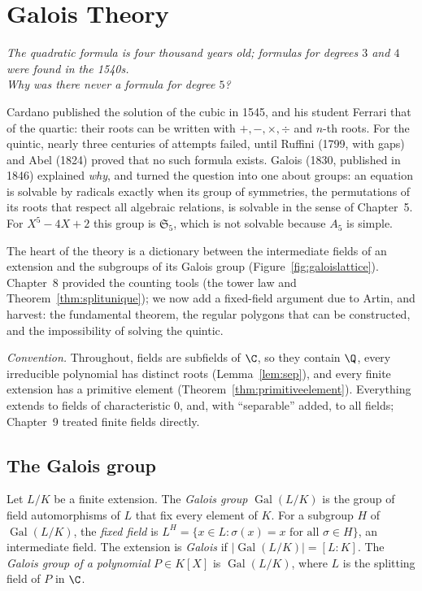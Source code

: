 \chapter{Galois Theory}

\begin{center}\itshape
The quadratic formula is four thousand years old; formulas for degrees $3$ and $4$ were found in the 1540s.\\
Why was there never a formula for degree $5$?
\end{center}

Cardano published the solution of the cubic in 1545, and his student Ferrari that of the quartic: their roots can be written with $+,-,\times,\div$ and $n$-th roots. For the quintic, nearly three centuries of attempts failed, until Ruffini (1799, with gaps) and Abel (1824) proved that no such formula exists. Galois (1830, published in 1846) explained \emph{why}, and turned the question into one about groups: an equation is solvable by radicals exactly when its group of symmetries, the permutations of its roots that respect all algebraic relations, is solvable in the sense of Chapter~5. For $X^5-4X+2$ this group is $\mathfrak S_5$, which is not solvable because $A_5$ is simple.

The heart of the theory is a dictionary between the intermediate fields of an extension and the subgroups of its Galois group (Figure~\ref{fig:galoislattice}). Chapter~8 provided the counting tools (the tower law and Theorem~\ref{thm:splitunique}); we now add a fixed-field argument due to Artin, and harvest: the fundamental theorem, the regular polygons that can be constructed, and the impossibility of solving the quintic.

\emph{Convention.} Throughout, fields are subfields of $\C$, so they contain $\Q$, every irreducible polynomial has distinct roots (Lemma~\ref{lem:sep}), and every finite extension has a primitive element (Theorem~\ref{thm:primitiveelement}). Everything extends to fields of characteristic $0$, and, with ``separable'' added, to all fields; Chapter~9 treated finite fields directly.

\section{The Galois group}

\begin{definition}\label{def:galois}
Let $L/K$ be a finite extension. The \emph{Galois group} $\operatorname{Gal}(L/K)$ is the group of field automorphisms of $L$ that fix every element of $K$. For a subgroup $H$ of $\operatorname{Gal}(L/K)$, the \emph{fixed field} is $L^H=\{x\in L:\sigma(x)=x\text{ for all }\sigma\in H\}$, an intermediate field. The extension is \emph{Galois} if $|\operatorname{Gal}(L/K)|=[L:K]$. The \emph{Galois group of a polynomial} $P\in K[X]$ is $\operatorname{Gal}(L/K)$, where $L$ is the splitting field of $P$ in $\C$.
\end{definition}

